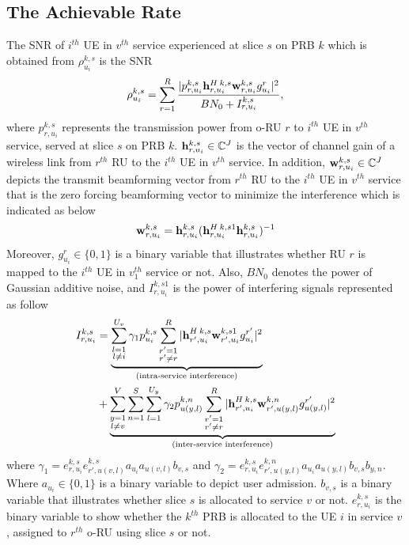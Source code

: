 \documentclass[conference]{IEEEtran}
\begin{document}
\subsection{The Achievable Rate}
The SNR of $i^{th}$ UE in $v^{th}$ service experienced at slice $s$ on PRB $k$ which is obtained from
 $\rho_{u_i}^{k,s}$ is the SNR 
\begin{equation}\label{eq2}
\rho_{u_i}^{k,s} =  \sum_{r=1}^{R}\frac{|p_{r,u_i}^{k,s}{\bold{h}_{r,u_i}^{H \: k,s}} \bold{w}_{r,u_i}^{k,s} g_{u_i}^r|^2}{BN_0 + I_{r,u_i}^{k,s}},
\end{equation} 
where $p_{r,u_i}^{k,s}$ represents the transmission power from o-RU $r$ to $i^{th}$ UE in $v^{th}$ service, served at slice $s$ on PRB $k$. 
${\bold{h}_{r,u_i}^{k,s}} \in \mathbb{C}^{J}$ is the vector of channel gain of a wireless link from 
$r^{th}$ RU to the $i^{th}$ UE in $v^{th}$ service. In addition, $\bold{w}_{r,u_i}^{k,s} \in \mathbb{C}^{J}$ depicts the  transmit beamforming vector from $r^{th}$ RU to the $i^{th}$ UE in $v^{th}$ service that is the zero forcing beamforming vector to minimize the interference which is indicated as below
\begin{equation}
\bold{w}_{r,u_i}^{k,s} = {\bold{h}_{r,u_i}^{k,s}}({\bold{h}_{r,u_i}^{H \: k,s1}} {\bold{h}_{r,u_i}^{k,s}})^{-1}
\end{equation}
Moreover, $g_{u_i}^r \in \{0,1\}$ is a binary variable that illustrates whether RU $r$ is mapped to the $i^{th}$ UE in $v_{1}^{th}$ service or not. 
Also, $BN_0$ denotes the power of Gaussian additive noise, and $I_{r,u_i}^{k,s1}$ is the power of interfering signals represented as follow
\begin{equation}
\begin{split}
I_{r,u_i}^{k,s} &=
 \underbrace{\sum_{\substack{l=1 \\ l\neq i}}^{{U}_{v}} \gamma_{1}  p_{u_i}^{k,s}\sum_{\substack{r'=1 \\ r'\neq r}}^{R}|{\bold{h}_{r',u_i}^{H \: k,s}} \bold{w}_{r',u_i}^{k,s1} g_{u_i}^{r'}|^2}_{\text{(intra-service interference)}}\\
&+ \underbrace{\sum_{\substack{y=1 \\ l\neq v}}^{V}\sum_{n=1}^{S}\sum_{l=1}^{{U}_y} \gamma_{2}  p_{u(y,l)}^{k,n}\sum_{\substack{r'=1 \\ r'\neq r}}^{R}|{\bold{h}_{r',u_i}^{H \: k,s}} \bold{w}_{r',u(y,l)}^{k,n} g_{u(y,l)}^{r'}|^2}_{\text{(inter-service interference)}}\\
\end{split}
\end{equation}
where $\gamma_{1} = e^{k,s}_{r,u_i}e^{k,s}_{r',u(v,l)}a_{u_i}a_{u(v,l)} b_{v, s} $
and $\gamma_{2} = e^{k,s}_{r,u_i}e^{k,n}_{r',u(y,l)}a_{u_i}a_{u(y,l)} b_{v, s} b_{y,n} $.
Where $a_{u_i} \in \{0,1\}$ is a binary variable to depict user admission.
$b_{v, s}$ is a binary variable that illustrates whether slice $s$ is allocated to service $v$ or not. 
$e^{k,s}_{r,u_i}$ is the binary variable to show whether the $k^{th}$ PRB is allocated to the UE $i$ in service $v$, assigned to $r^{th}$ o-RU using slice $s$ or not.
\end{document}
